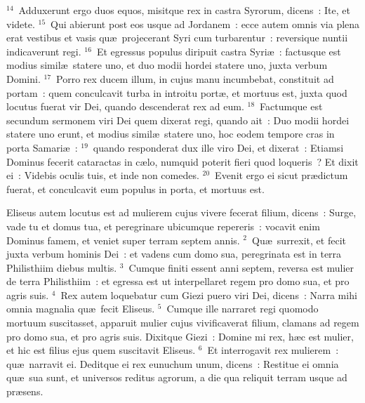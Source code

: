 ${}^{14}$~Adduxerunt ergo duos equos, misitque rex in castra Syrorum, dicens~: Ite, et videte.
${}^{15}$~Qui abierunt post eos usque ad Jordanem~: ecce autem omnis via plena erat vestibus et vasis qu\ae\ projecerant Syri cum turbarentur~: reversique nuntii indicaverunt regi.
${}^{16}$~Et egressus populus diripuit castra Syri\ae~: factusque est modius simil\ae\ statere uno, et duo modii hordei statere uno, juxta verbum Domini.
${}^{17}$~Porro rex ducem illum, in cujus manu incumbebat, constituit ad portam~: quem conculcavit turba in introitu port\ae , et mortuus est, juxta quod locutus fuerat vir Dei, quando descenderat rex ad eum.
${}^{18}$~Factumque est secundum sermonem viri Dei quem dixerat regi, quando ait~: Duo modii hordei statere uno erunt, et modius simil\ae\ statere uno, hoc eodem tempore cras in porta Samari\ae~:
${}^{19}$~quando responderat dux ille viro Dei, et dixerat~: Etiamsi Dominus fecerit cataractas in c\ae lo, numquid poterit fieri quod loqueris~? Et dixit ei~: Videbis oculis tuis, et inde non comedes.
${}^{20}$~Evenit ergo ei sicut pr\ae dictum fuerat, et conculcavit eum populus in porta, et mortuus est.

\bchapter
\lettrine[lines=3,image=true,loversize=0.05,lraise=-0.03]{E}{}liseus autem locutus est ad mulierem cujus vivere fecerat filium, dicens~: Surge, vade tu et domus tua, et peregrinare ubicumque repereris~: vocavit enim Dominus famem, et veniet super terram septem annis.
${}^{2}$~Qu\ae\ surrexit, et fecit juxta verbum hominis Dei~: et vadens cum domo sua, peregrinata est in terra Philisthiim diebus multis.
${}^{3}$~Cumque finiti essent anni septem, reversa est mulier de terra Philisthiim~: et egressa est ut interpellaret regem pro domo sua, et pro agris suis.
${}^{4}$~Rex autem loquebatur cum Giezi puero viri Dei, dicens~: Narra mihi omnia magnalia qu\ae\ fecit Eliseus.
${}^{5}$~Cumque ille narraret regi quomodo mortuum suscitasset, apparuit mulier cujus vivificaverat filium, clamans ad regem pro domo sua, et pro agris suis. Dixitque Giezi~: Domine mi rex, h\ae c est mulier, et hic est filius ejus quem suscitavit Eliseus.
${}^{6}$~Et interrogavit rex mulierem~: qu\ae\ narravit ei. Deditque ei rex eunuchum unum, dicens~: Restitue ei omnia qu\ae\ sua sunt, et universos reditus agrorum, a die qua reliquit terram usque ad pr\ae sens.


